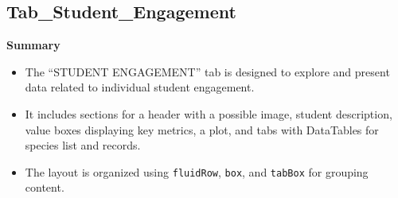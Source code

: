 \documentclass[
]{book}
\begin{document}
\hypertarget{tab_student_engagement}{%
\subsection{Tab\_Student\_Engagement}\label{tab_student_engagement}}

\textbf{Summary}

\begin{itemize}
\item
  The ``STUDENT ENGAGEMENT'' tab is designed to explore and present data related to individual student engagement.
\item
  It includes sections for a header with a possible image, student description, value boxes displaying key metrics, a plot, and tabs with DataTables for species list and records.
\item
  The layout is organized using \texttt{fluidRow}, \texttt{box}, and \texttt{tabBox} for grouping content.
\end{itemize}
\end{document}
